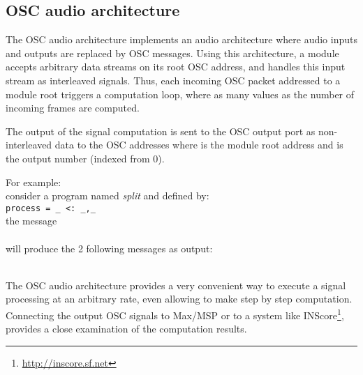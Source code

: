 \subsection{OSC audio architecture}
\label{sec:oscaudio}

The OSC audio architecture implements an audio architecture where audio inputs and outputs are replaced by OSC messages. Using this architecture, a \faust module accepts arbitrary data streams on its root OSC address, and handles this input stream as interleaved signals. Thus, each incoming OSC packet addressed to a module root triggers a computation loop, where as many values as the number of incoming frames are computed.

The output of the signal computation is sent to the OSC output port as non-interleaved data to the OSC addresses  where  is the module root address and  is the output number (indexed from 0).

For example: \\
consider a \faust program named \emph{split} and defined by:\\
\hspace*{6mm} \lstinline'process = _ <: _,_' \\
the message \\
\hspace*{6mm} 
\\ will produce the 2 following messages as output: \\
\hspace*{6mm}\\
\hspace*{6mm}


The OSC audio architecture provides a very convenient way to execute a signal processing at an arbitrary rate, even allowing to make step by step computation. Connecting the output OSC signals to Max/MSP or to a system like INScore\footnote{\url{http://inscore.sf.net}}\cite{Fober:10c}, provides a close examination of the computation results.

